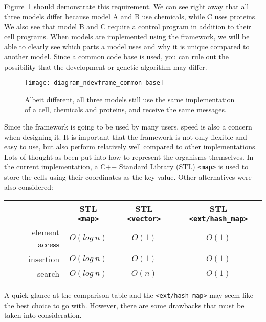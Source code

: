 Figure~\ref{fig:diagram_ndevframe_common-base} should demonstrate this requirement. We can see right away that all three models differ because model A and B use chemicals, while C uses proteins. We also see that model B and C require a control program in addition to their cell programs. When models are implemented using the framework, we will be able to clearly see which parts a model uses and why it is unique compared to another model. Since a common code base is used, you can rule out the possibility that the development or genetic algorithm may differ.

\begin{figure}[!ht]
	\centering
	\texttt{[image: diagram\_ndevframe\_common-base]}
	\caption{Albeit different, all three models still use the same implementation of a cell, chemicals and proteins, and receive the same messages.}
	\label{fig:diagram_ndevframe_common-base}
\end{figure}

Since the framework is going to be used by many users, speed is also a concern when designing it. It is important that the framework is not only flexible and easy to use, but also perform relatively well compared to other implementations. Lots of thought as been put into how to represent the organisms themselves. In the current implementation, a C++ Standard Library (STL) \texttt{<map>} is used to store the cells using their coordinates as the key value. Other alternatives were also considered:

\begin{center}
	\begin{tabular}{ r | c | c | c }
		~ & STL \texttt{<map>} & STL \texttt{<vector>} & STL \texttt{<ext/hash\_map>} \\
		\hline
		element access & $O(log~n)$ & $O(1)$ & $O(1)$ \\
		\hline
		insertion & $O(log~n)$ & $O(1)$ & $O(1)$ \\
		\hline
		search & $O(log~n)$ & $O(n)$ & $O(1)$ \\
	\end{tabular}
	\label{tbl:speed}
\end{center}

A quick glance at the comparison table and the \texttt{<ext/hash\_map>} may seem like the best choice to go with. However, there are some drawbacks that must be taken into consideration.

